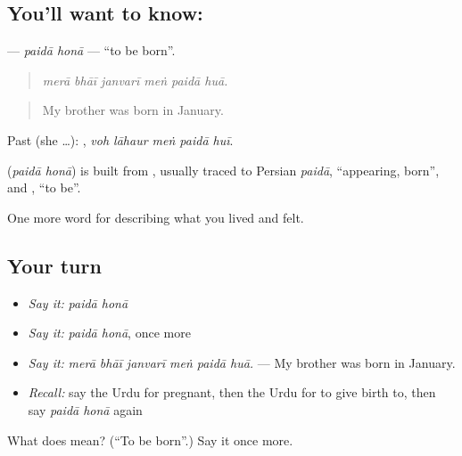 \subsection*{You'll want to know:  }
\textbf{ } — \emph{paidā honā} — \textquotedblleft{}to be born\textquotedblright{}.

\begin{quote}
     
\end{quote}

\begin{quote}
\emph{merā bhāī janvarī meṅ paidā huā.}
\end{quote}

\begin{quote}
My brother was born in January.
\end{quote}

Past (she …):     , \emph{voh lāhaur meṅ paidā huī}.

\begin{cousinweb}
\textbf{ } (\emph{paidā honā}) is built from \textbf{}, usually traced to Persian \emph{paidā}, \textquotedblleft{}appearing, born\textquotedblright{}, and \textbf{}, \textquotedblleft{}to be\textquotedblright{}.
\end{cousinweb}

\begin{grammarlens}[title={What you've built}]
One more word for describing what you lived and felt.
\end{grammarlens}

\subsection*{Your turn}
\begin{itemize}
\raggedright
  \item \emph{Say it:} \emph{paidā honā}
  \item \emph{Say it:} \emph{paidā honā}, once more
  \item \emph{Say it:} \emph{merā bhāī janvarī meṅ paidā huā.} — My brother was born in January.
  \item \emph{Recall:} say the Urdu for pregnant, then the Urdu for to give birth to, then say \emph{paidā honā} again
\end{itemize}

\begin{tcolorbox}[breakable,colback=teal!4,colframe=teal!35!black,title={Before you move on}]
What does   mean? (\textquotedblleft{}To be born\textquotedblright{}.) Say it once more.
\end{tcolorbox}
